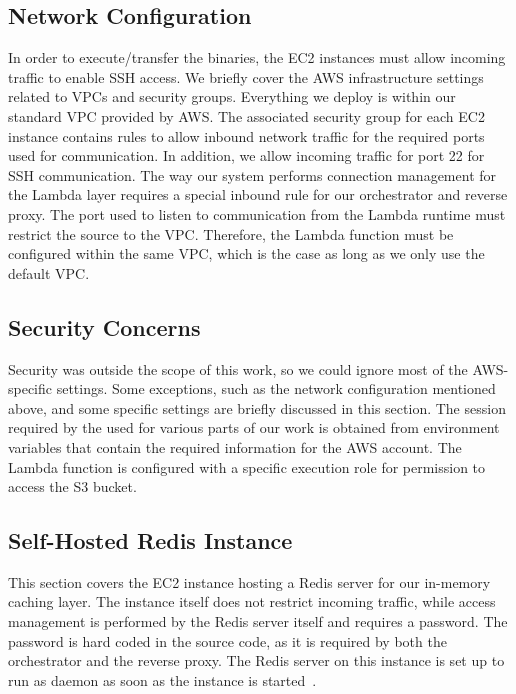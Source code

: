 \subsection{Network Configuration}
\label{subsec:network_configuration}
In order to execute/transfer the binaries, the EC2 instances must allow incoming traffic to enable SSH access. We briefly cover the AWS infrastructure settings related to VPCs and security groups. Everything we deploy is within our standard VPC provided by AWS. The associated security group for each EC2 instance contains rules to allow inbound network traffic for the required ports used for communication. In addition, we allow incoming traffic for port 22 for SSH communication. The way our system performs connection management for the Lambda layer requires a special inbound rule for our orchestrator and reverse proxy. The port used to listen to communication from the Lambda runtime must restrict the source to the VPC. Therefore, the Lambda function must be configured within the same VPC, which is the case as long as we only use the default VPC.

\subsection{Security Concerns}
\label{subsec:security_concerns}
Security was outside the scope of this work, so we could ignore most of the AWS-specific settings. Some exceptions, such as the network configuration mentioned above, and some specific settings are briefly discussed in this section. The session required by the  used for various parts of our work is obtained from environment variables that contain the required information for the AWS account. The Lambda function is configured with a specific execution role for permission to access the S3 bucket.

\subsection{Self-Hosted Redis Instance}
\label{subsec:self_hosted_redis_instance}
This section covers the EC2 instance hosting a Redis server for our in-memory caching layer. The instance itself does not restrict incoming traffic, while access management is performed by the Redis server itself and requires a password. The password is hard coded in the source code, as it is required by both the orchestrator and the reverse proxy. The Redis server on this instance is set up to run as daemon as soon as the instance is started~\cite{hsieh_spin_2020}.

